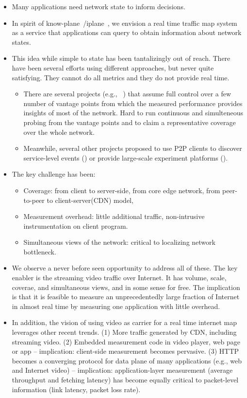 \comment
{\begin{itemize}
	\item Many applications need network state to inform decisions. 
	\item In spirit of know-plane~\cite{kplane}/iplane~\cite{iplane}, we envision a real time traffic map system as a service that applications can query to obtain information about network states. 
	\item This idea while simple to state has been tantalizingly out of reach. There have been several efforts using different approaches, but never quite satisfying. They cannot do all metrics and they do not provide real time.
	\begin{itemize}
		\item There are several projects (e.g., ~\cite{ningning,iplane}) that assume full control over a few number of vantage points from which the measured performance provides insights of most of the network. Hard to run continuous and simulteneous probing from the vantage points and to claim a representative coverage over the whole network. 
		\item Meanwhile, several other projects proposed to use P2P clients to discover service-level events (\cite{crowdsourcing}) or provide large-scale experiment platforms (\cite{dasu}).
	\end{itemize}
	\item The key challenge has been:
	\begin{itemize} 
		\item Coverage: from client to server-side, from core edge network, from peer-to-peer to client-server(CDN) model, 
		\item Measurement overhead: little additional traffic, non-intrusive instrumentation on client program.
		\item Simultaneous views of the network: critical to localizing network bottleneck.
	\end{itemize}
	\item We observe a never before seen opportunity to address all of these. The key enabler is the streaming video traffic over Internet. It has volume, scale, coverae, and simultaneous views, and in some sense for free. The implication is that it is feasible to measure an unprecedentedly large fraction of Internet in almost real time by measuring one application with little overhead.
	\item In addition, the vision of using video as carrier for a real time internet map leverages other recent trends. (1) More traffic generated by CDN, including streaming video. (2) Embedded measurement code in video player, web page or app -- implication: client-side measurement becomes pervasive. (3) HTTP becomes a converging protocol for data plane of many applications (e.g., web and Internet video) -- implication: application-layer measurement (average throughput and fetching latency) has become equally critical to packet-level information (link latency, packet loss rate).

\end{itemize}}
